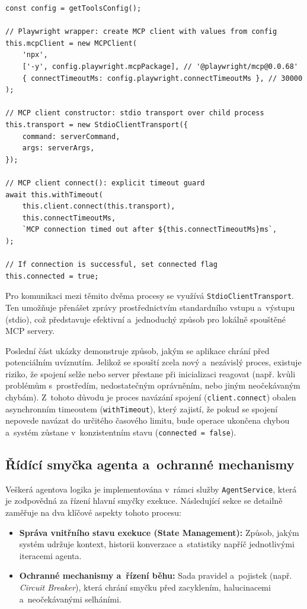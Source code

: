 \documentclass[czech, ing, kiv, he, iso690numb, viewonly]{fasthesis}
\begin{document}
\begin{lstlisting}[style=tscode, caption={\protect\centering Zkrácený proces inicializace MCP.}, label={lst:mcp-integration-code}]
const config = getToolsConfig();

// Playwright wrapper: create MCP client with values from config
this.mcpClient = new MCPClient(
    'npx',
    ['-y', config.playwright.mcpPackage], // '@playwright/mcp@0.0.68'
    { connectTimeoutMs: config.playwright.connectTimeoutMs }, // 30000
);

// MCP client constructor: stdio transport over child process
this.transport = new StdioClientTransport({
    command: serverCommand,
    args: serverArgs,
});

// MCP client connect(): explicit timeout guard
await this.withTimeout(
    this.client.connect(this.transport),
    this.connectTimeoutMs,
    `MCP connection timed out after ${this.connectTimeoutMs}ms`,
);

// If connection is successful, set connected flag
this.connected = true;
\end{lstlisting}

Pro komunikaci mezi těmito dvěma procesy se využívá \texttt{StdioClientTransport}.
Ten umožňuje přenášet zprávy prostřednictvím standardního vstupu a~výstupu (stdio),
což představuje efektivní a~jednoduchý způsob pro lokálně spouštěné MCP servery.

Poslední část ukázky demonstruje způsob, jakým se aplikace chrání před potenciálním uvíznutím.
Jelikož se spouští zcela nový a~nezávislý proces, existuje riziko, že spojení selže nebo server přestane 
při inicializaci reagovat (např. kvůli problémům s~prostředím, nedostatečným oprávněním, nebo jiným neočekávaným chybám).
Z~tohoto důvodu je proces navázání spojení (\texttt{client.connect}) obalen asynchronním timeoutem (\texttt{withTimeout}), 
který zajistí, že pokud se spojení nepovede navázat do určitého časového limitu,
 bude operace ukončena chybou a~systém zůstane v~konzistentním stavu (\texttt{connected = false}).


\subsection{Řídící smyčka agenta a~ochranné mechanismy}

Veškerá agentova logika je implementována v~rámci služby \texttt{AgentService}, 
která je zodpovědná za řízení hlavní smyčky exekuce. Následující sekce se detailně 
zaměřuje na dva klíčové aspekty tohoto procesu:
\begin{itemize}
    \item \textbf{Správa vnitřního stavu exekuce (State Management):} Způsob, jakým systém udržuje kontext, historii konverzace a~statistiky napříč jednotlivými iteracemi agenta.
    \item \textbf{Ochranné mechanismy a~řízení běhu:} Sada pravidel a~pojistek (např. \textit{Circuit Breaker}), která chrání smyčku před zacyklením, halucinacemi a~neočekávanými selháními.
\end{itemize}
\end{document}
